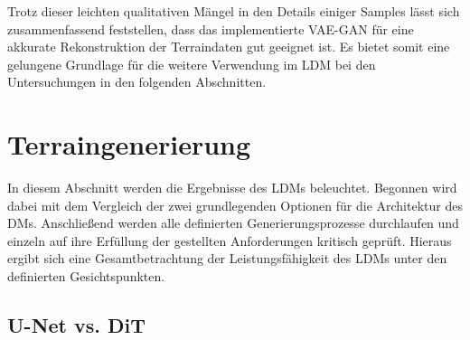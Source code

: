 Trotz dieser leichten qualitativen Mängel in den Details einiger Samples lässt sich zusammenfassend feststellen, dass das implementierte VAE-GAN für eine akkurate Rekonstruktion der Terraindaten gut geeignet ist. Es bietet somit eine gelungene Grundlage für die weitere Verwendung im \ac{LDM} bei den Untersuchungen in den folgenden Abschnitten.

\section {Terraingenerierung}

In diesem Abschnitt werden die Ergebnisse des LDMs beleuchtet. Begonnen wird dabei mit dem Vergleich der zwei grundlegenden Optionen für die Architektur des \ac{DM}s. Anschließend werden alle definierten Generierungsprozesse durchlaufen und einzeln auf ihre Erfüllung der gestellten Anforderungen kritisch geprüft. Hieraus ergibt sich eine Gesamtbetrachtung der Leistungsfähigkeit des \ac{LDM}s unter den definierten Gesichtspunkten. 

\subsection {U-Net vs. DiT}


